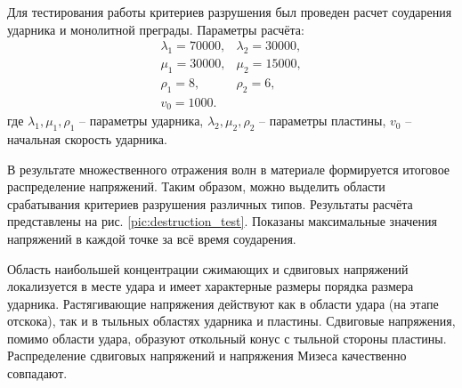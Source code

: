 Для тестирования работы критериев разрушения был проведен расчет соударения ударника и монолитной преграды. Параметры расчёта:
\begin{eqnarray}
\lambda_1=70000, & \lambda_2=30000, \nonumber\\
\mu_1=30000, & \mu_2=15000, \nonumber\\
\rho_1=8, & \rho_2=6, \nonumber\\
v_0 = 1000.
\end{eqnarray}
где $\lambda_1, \mu_1, \rho_1$ -- параметры ударника, $\lambda_2, \mu_2, \rho_2$ -- параметры пластины, $v_0$ -- начальная скорость ударника.

В результате множественного отражения волн в материале формируется итоговое распределение напряжений. Таким образом, можно выделить области срабатывания критериев разрушения различных типов. Результаты расчёта представлены на рис. \ref{pic:destruction_test}. Показаны максимальные значения напряжений в каждой точке за всё время соударения.

Область наибольшей концентрации сжимающих и сдвиговых напряжений локализуется в месте удара и имеет характерные размеры порядка размера ударника. Растягивающие напряжения действуют как в области удара (на этапе отскока), так и в тыльных областях ударника и пластины. Сдвиговые напряжения, помимо области удара, образуют откольный конус с тыльной стороны пластины. Распределение сдвиговых напряжений и напряжения Мизеса качественно совпадают.

